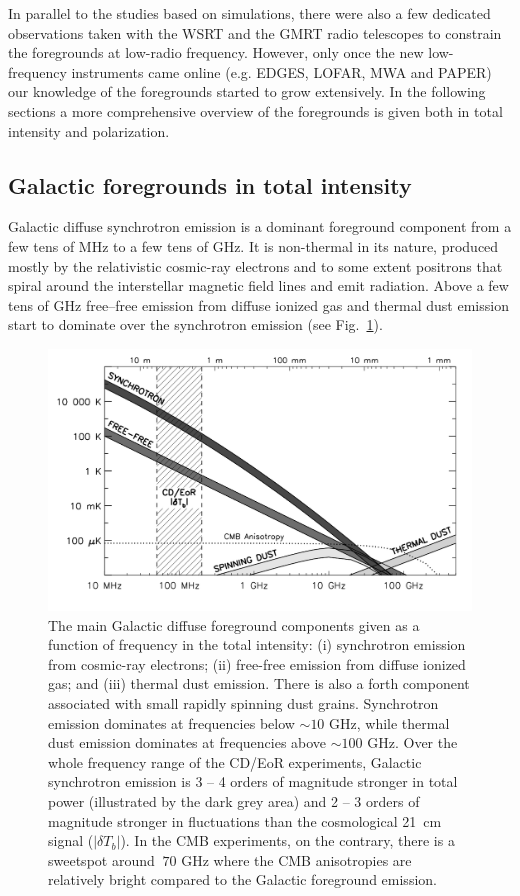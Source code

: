 In parallel to the studies based on simulations, there were also a few dedicated observations taken with the WSRT \cite{bernardi09, bernardi10} and the GMRT \cite{pen09} radio telescopes to constrain the foregrounds at low-radio frequency. However, only once the new low-frequency instruments came online (e.g. EDGES, LOFAR, MWA and PAPER) our knowledge of the foregrounds started to grow extensively. In the following sections a more comprehensive overview of the foregrounds is given both in total intensity and polarization. 

\subsection{Galactic foregrounds in total intensity}
Galactic diffuse synchrotron emission is a dominant foreground component from a few tens of MHz to a few tens of GHz. It is non-thermal in its nature, produced mostly by the relativistic cosmic-ray electrons and to some extent positrons that spiral around the interstellar magnetic field lines and emit radiation.  Above a few tens of GHz free--free emission from diffuse ionized gas and thermal dust emission start to dominate over the synchrotron emission (see Fig.~\ref{fig:galcomp}). 

\begin{figure}[!t]
\centering
    \includegraphics[width=.95\textwidth]{Chapman_Jelic/Images/galcomp.png}
    \caption{The main Galactic diffuse foreground components given as a function of frequency in the total intensity: (i) synchrotron emission from cosmic-ray electrons; (ii) free-free emission from diffuse ionized gas; and (iii) thermal dust emission. There is also a forth component associated with small rapidly spinning dust grains. Synchrotron emission dominates at frequencies below $\sim 10$ GHz, while thermal dust emission dominates at frequencies above $\sim 100$ GHz. Over the whole frequency range of the CD/EoR experiments, Galactic synchrotron emission is 3 -- 4 orders of magnitude stronger in total power (illustrated by the dark grey area) and 2 -- 3 orders of magnitude stronger in fluctuations than the cosmological 21~cm signal ($|\delta T_b|$). In the CMB experiments, on the contrary, there is a sweetspot around $~70$ GHz where the CMB anisotropies are relatively bright compared to the Galactic foreground emission.}
    \label{fig:galcomp}
\end{figure}

